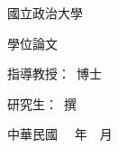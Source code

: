 \begin{titlepage}
\begin{center}

\vspace*{\fill} 

{\fontsize{18pt}{27pt}\selectfont 國立政治大學\deptCname\par}

\vspace{\fill} 

{\fontsize{20pt}{30pt}\selectfont \degreeCname 學位論文\par}

\vspace{\fill} 

{\fontsize{20pt}{30pt}\selectfont \cTitle\par}

\vspace{0.8cm} 

{\fontsize{16pt}{24pt}\selectfont \eTitle\par}

\vspace{\fill} 

{\fontsize{18pt}{27pt}\selectfont 指導教授：\advisorCname \ 博士\par}
\vspace{0.3cm}
{\fontsize{18pt}{27pt}\selectfont 研究生：\myCname \ 撰\par}

\vspace{\fill} 

{\fontsize{18pt}{27pt}\selectfont 中華民國\ \cYear{} \ 年\ \cMonth{}\ 月\par}

\vspace*{\fill} 

\end{center}
\end{titlepage}